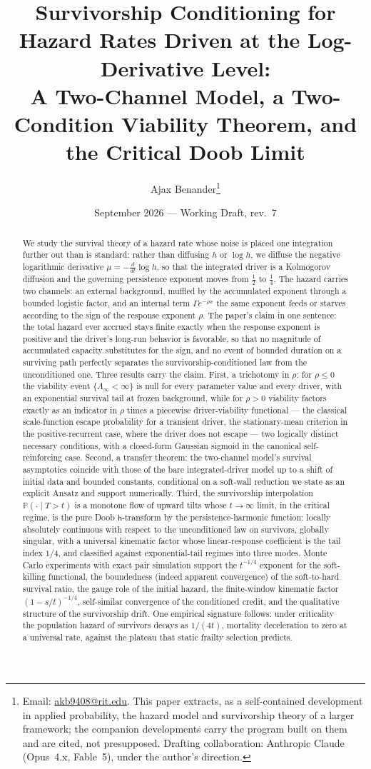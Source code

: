 \documentclass[11pt]{article}
\title{Survivorship Conditioning for Hazard Rates Driven at the
Log-Derivative Level:\\ \large A Two-Channel Model, a Two-Condition
Viability Theorem, and the Critical Doob Limit}
\author{Ajax Benander\thanks{Email:
\href{mailto:akb9408@rit.edu}{akb9408@rit.edu}. This paper extracts, as
a self-contained development in applied probability, the hazard model
and survivorship theory of a larger framework; the companion
developments carry the program built on them and are cited, not
presupposed. Drafting collaboration: Anthropic Claude (Opus~4.x,
Fable~5), under the author's direction.}}
\date{September 2026 --- Working Draft, rev.~7}
\theoremstyle{definition}
\theoremstyle{remark}
\newcommand{\PP}{\mathbb{P}}
\newcommand{\hm}{\mathsf{h}}
\begin{document}
\maketitle

\begin{abstract}
We study the survival theory of a hazard rate whose noise is placed one
integration further out than is standard: rather than diffusing $h$ or
$\log h$, we diffuse the negative logarithmic derivative
$\mu=-\frac{d}{dt}\log h$, so that the integrated driver is a
Kolmogorov diffusion and the governing persistence exponent moves from
$\tfrac12$ to $\tfrac14$. The hazard carries two channels: an external
background, muffled by the accumulated exponent through a bounded
logistic factor, and an internal term $\Gamma e^{-\rho x}$ the same
exponent feeds or starves according to the sign of the response
exponent $\rho$. The paper's claim in one sentence: the
total hazard ever accrued stays finite exactly when the response
exponent is positive and the driver's long-run behavior is favorable,
so that no magnitude of accumulated capacity substitutes for the sign,
and no event of bounded duration on a surviving path
perfectly separates the survivorship-conditioned law from the
unconditioned one. Three results carry the claim. First, a
trichotomy in $\rho$: for $\rho\le0$ the viability event
$\{\Lambda_\infty<\infty\}$ is null for every parameter value and every
driver, with an exponential survival tail at frozen background, while
for $\rho>0$ viability factors exactly as an indicator in $\rho$ times
a piecewise driver-viability functional --- the classical
scale-function escape probability for a transient driver, the
stationary-mean criterion in the positive-recurrent case, where the
driver does not escape ---
two logically distinct necessary conditions, with a closed-form Gaussian
sigmoid in the canonical self-reinforcing case. Second, a transfer
theorem: the two-channel model's survival asymptotics coincide with
those of the bare integrated-driver model up to a shift of initial data
and bounded constants, conditional on a soft-wall reduction we state as
an explicit Ansatz and support numerically. Third, the survivorship
interpolation $\PP(\cdot\mid T>t)$ is a monotone flow of upward tilts
whose $t\to\infty$ limit, in the critical regime, is the pure Doob
$\hm$-transform by the persistence-harmonic function: locally
absolutely continuous with respect to the unconditioned law on
survivors, globally singular, with a universal kinematic factor whose
linear-response coefficient is the tail index $1/4$, and classified
against exponential-tail regimes into three modes. Monte Carlo
experiments with exact pair simulation support the $t^{-1/4}$ exponent
for the soft-killing functional, the boundedness (indeed apparent
convergence) of the soft-to-hard survival ratio, the gauge role of the
initial hazard, the finite-window kinematic factor $(1-s/t)^{-1/4}$,
self-similar convergence of the conditioned credit, and the
qualitative structure of the survivorship drift. One empirical
signature follows: under criticality the population hazard of
survivors decays as $1/(4t)$, mortality deceleration to zero at a
universal rate, against the plateau that static frailty selection
predicts.
\end{abstract}
\end{document}
